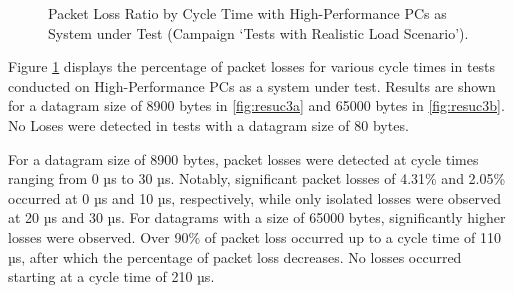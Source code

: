 \begin{figure}[h!]
  \centering
  \caption{Packet Loss Ratio by Cycle Time with High-Performance PCs as System under Test (Campaign `Tests with Realistic Load Scenario').}
  \label{fig:resuc3}
\end{figure}

Figure \ref{fig:resuc3} displays the percentage of packet losses for various cycle times in tests conducted on High-Performance PCs as a system under test. Results are shown for a datagram size of 8900 bytes in \ref{fig:resuc3a} and 65000 bytes in \ref{fig:resuc3b}. No Loses were detected in tests with a datagram size of 80 bytes.

For a datagram size of 8900 bytes, packet losses were detected at cycle times ranging from 0 µs to 30 µs. Notably, significant packet losses of 4.31\% and 2.05\% occurred at 0 µs and 10 µs, respectively, while only isolated losses were observed at 20 µs and 30 µs. For datagrams with a size of 65000 bytes, significantly higher losses were observed. Over 90\% of packet loss occurred up to a cycle time of 110 µs, after which the percentage of packet loss decreases. No losses occurred starting at a cycle time of 210 µs.

